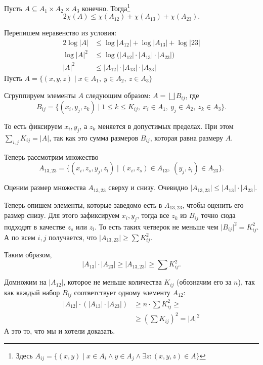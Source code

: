 \begin{lm}
	Пусть $ A \subseteq A_1 \times A_2 \times A_3$ конечно.
	Тогда\footnote{Здесь $ A_{ij} = \{(x, y) \mid x \in A_i \land y \in  A_j \land \exists z\colon  (x, y, z) \in A \}$}
	\[
		2 \chi(A) \le \chi(A_{12}) + \chi(A_{13}) + \chi(A_{23})
	.\] 
\end{lm}
\begin{proof*}
	Перепишем неравенство из условия:
	\begin{align*}
		2 \log \lvert A \rvert &\le \log \lvert A_{12} \rvert  + \log  \lvert A_{13} \rvert  + \log \lvert 23 \rvert  \\
		\log \lvert A \rvert^2 & \le \log \bigl(\lvert A_{12} \rvert \cdot \lvert A_{13} \rvert \cdot \lvert A_{23} \rvert\bigr)   \\
		\lvert A \rvert ^2 &\le \lvert A_{12} \rvert \cdot \lvert A_{13} \rvert \cdot \lvert A_{23} \rvert \tag{$ \log$  --- возрастающая функция}  
	\end{align*}
	Пусть $ A = \{(x, y, z) \mid x \in A_1 , ~ y \in A_2 , ~ z \in A_3\}$

	Сгруппируем элементы $ A$ следующим образом: $ A = \bigsqcup B_{ij}$, где 
	$$ B_{ij} = \{(x_i, y_j, z_k) \mid 1 \le k \le K_{ij} , ~ x_i \in A_1 , ~ y_j \in  A_2 , ~ z_k \in A_3\}.$$

	То есть фиксируем $ x_i, y_j$, а $ z_k$ меняется в допустимых пределах. 
	При этом $ \sum_{i, j} K_{ij} = \lvert A \rvert $, так как это сумма размеров $ B_{ij}$, которая равна размеру $ A$. 
	
	Теперь рассмотрим множество 
	\[
		A_{13, 23} = \{(x_i, z_s, y_j, z_l) \mid (x_i, z_s) \in A_{13}, ~ (y_j, z_l)  \in A_{23}\}
	.\] 

	Оценим размер множества $ A_{13,23}$ сверху и снизу.
	Очевидно $ \lvert A_{13, 23} \rvert \le \lvert A_{13} \rvert \cdot \lvert A_{23} \rvert $.

	Теперь опишем элементы, которые заведомо есть в $ A_{13, 23}$, чтобы оценить его размер снизу.
	Для этого зафиксируем $ x_i, y_j$, тогда все $ z_k$ из $ B_{ij}$ точно сюда подходят в качестве $ z_s$ или $ z_l$. То есть таких четверок не меньше чем $ \lvert B_{ij}\rvert^2 = K_{ij}^2$. 
	А по всем $ i, j$ получается, что $ \lvert A_{13,23}  \rvert \ge \sum K_{ij}^2$.

	Таким образом,
	\[
		\lvert A_{13} \rvert 	\cdot  \lvert A_{23} \rvert  \ge \lvert A_{13,23} \rvert \ge \sum K_{ij}^2 
	.\] 

	Домножим на $ \lvert A_{12} \rvert $, которое не меньше количества $ K_{ij}$ (обозначим его за $ n$), так как каждый набор $ B_{ij}$ соответствует одному элементу $ A_{12}$:
	\begin{align*}
		\lvert A_{12} \rvert  \cdot \left( \lvert A_{13} \rvert \cdot \lvert A_{23} \rvert   \right) &\ge  n \cdot \sum K_{ij}^2 \ge \tag{неравенство о средних} \\
																									 & \ge \left( \sum K_{ij} \right)^2 = \lvert A \rvert ^2 
	\end{align*}
	А это то, что мы и хотели доказать.
\end{proof*}

